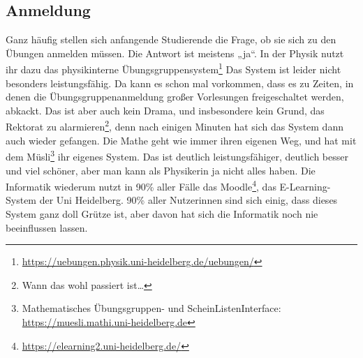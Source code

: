 \subsection{Anmeldung}
Ganz häufig stellen sich anfangende Studierende die Frage, ob sie sich zu den Übungen anmelden müssen. Die Antwort ist meistens „ja“. In der Physik nutzt ihr dazu das physikinterne Übungsgruppensystem\footnote{\url{https://uebungen.physik.uni-heidelberg.de/uebungen/}} Das System ist leider nicht besonders leistungsfähig. Da kann es schon mal vorkommen, dass es zu Zeiten, in denen die Übungsgruppenanmeldung großer Vorlesungen freigeschaltet werden, abkackt. Das ist aber auch kein Drama, und insbesondere kein Grund, das Rektorat zu alarmieren\footnote{Wann das wohl passiert ist…}, denn nach einigen Minuten hat sich das System dann auch wieder gefangen. Die Mathe geht wie immer ihren eigenen Weg, und hat mit dem Müsli\footnote{Mathematisches Übungsgruppen- und ScheinListenInterface:\\ \url{https://muesli.mathi.uni-heidelberg.de}} ihr eigenes System. Das ist deutlich leistungsfähiger, deutlich besser und viel schöner, aber man kann als Physikerin ja nicht alles haben. Die Informatik wiederum nutzt in 90\% aller Fälle das Moodle\footnote{\url{https://elearning2.uni-heidelberg.de/}}, das E-Learning-System der Uni Heidelberg. 90\% aller Nutzerinnen sind sich einig, dass dieses System ganz doll Grütze ist, aber davon hat sich die Informatik noch nie beeinflussen lassen.
